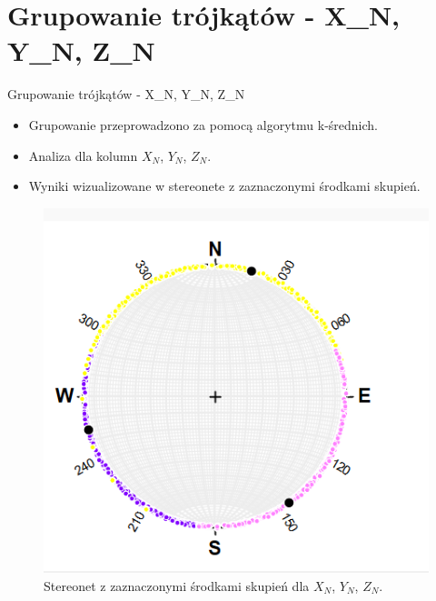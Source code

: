 \documentclass{beamer}
\begin{document}
\section{Grupowanie trójkątów - X\_N, Y\_N, Z\_N}
\begin{frame}{Grupowanie trójkątów - X\_N, Y\_N, Z\_N}
    \begin{itemize}
        \item Grupowanie przeprowadzono za pomocą algorytmu k-średnich.
        \item Analiza dla kolumn $X_N$, $Y_N$, $Z_N$.
        \item Wyniki wizualizowane w stereonete z zaznaczonymi środkami skupień.
    \end{itemize}
    \begin{figure}
        \includegraphics[scale=0.5]{X_N.png}
        \caption{Stereonet z zaznaczonymi środkami skupień dla $X_N$, $Y_N$, $Z_N$.}
    \end{figure}
\end{frame}

\end{document}
